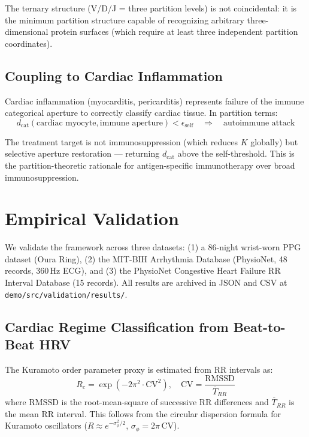 \documentclass[12pt,a4paper]{article}
\theoremstyle{definition}
\newcommand{\dcat}{d_{\text{cat}}}
\begin{document}
The ternary structure (V/D/J = three partition levels) is not coincidental:
it is the minimum partition structure capable of recognizing arbitrary
three-dimensional protein surfaces (which require at least three independent
partition coordinates).

\subsection{Coupling to Cardiac Inflammation}

Cardiac inflammation (myocarditis, pericarditis) represents failure of
the immune categorical aperture to correctly classify cardiac tissue.
In partition terms:
\begin{equation}
\dcat(\text{cardiac myocyte}, \text{immune aperture}) < \epsilon_{\text{self}}
\quad \Rightarrow \quad \text{autoimmune attack}
\end{equation}

The treatment target is not immunosuppression (which reduces $K$ globally)
but selective aperture restoration — returning $\dcat$ above the self-threshold.
This is the partition-theoretic rationale for antigen-specific immunotherapy
over broad immunosuppression.

\section{Empirical Validation}
\label{sec:validation}

We validate the framework across three datasets: (1) a 86-night wrist-worn
PPG dataset (Oura Ring), (2) the MIT-BIH Arrhythmia Database (PhysioNet,
48 records, 360\,Hz ECG), and (3) the PhysioNet Congestive Heart Failure
RR Interval Database (15 records). All results are archived in JSON and CSV
at \texttt{demo/src/validation/results/}.

\subsection{Cardiac Regime Classification from Beat-to-Beat HRV}

The Kuramoto order parameter proxy is estimated from RR intervals as:
\begin{equation}
\label{eq:rc_estimator}
R_c = \exp\!\left(-2\pi^2 \cdot \mathrm{CV}^2\right), \quad
\mathrm{CV} = \frac{\mathrm{RMSSD}}{\overline{T}_{RR}}
\end{equation}
where $\mathrm{RMSSD}$ is the root-mean-square of successive RR differences
and $\overline{T}_{RR}$ is the mean RR interval. This follows from the
circular dispersion formula for Kuramoto oscillators
($R \approx e^{-\sigma_\phi^2/2}$, $\sigma_\phi = 2\pi\,\mathrm{CV}$).
\end{document}
